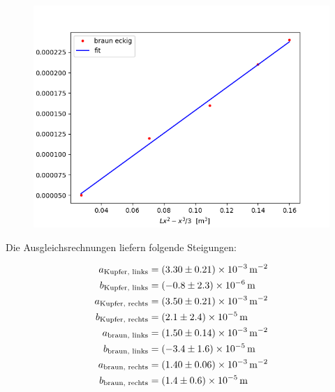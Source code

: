 \begin{figure}[H]
    \centering
    \includegraphics{beb2.png}
\end{figure}

\noindent Die Ausgleichsrechnungen liefern folgende Steigungen:

\begin{align*}
    a_\text{Kupfer, links} &= \SI[separate-uncertainty=true]{3.30(0.21)E-3}{\per \square\metre} \\
    b_\text{Kupfer, links} &= \SI[separate-uncertainty=true]{-0.8(2.3)E-6}{\metre} \\
    a_\text{Kupfer, rechts} &=  \SI[separate-uncertainty=true]{3.50(0.21)E-3}{\per \square\metre} \\
    b_\text{Kupfer, rechts} &= \SI[separate-uncertainty=true]{2.1(2.4)E-5}{\metre} \\
    a_\text{braun, links} &= \SI[separate-uncertainty=true]{1.50(0.14)E-3}{\per \square\metre} \\
    b_\text{braun, links} &= \SI[separate-uncertainty=true]{-3.4(1.6)E-5}{\metre} \\
    a_\text{braun, rechts} &= \SI[separate-uncertainty=true]{1.40(0.06)E-3}{\per \square\metre} \\
    b_\text{braun, rechts} &= \SI[separate-uncertainty=true]{1.4(0.6)E-5}{\metre} \\
\end{align*}

